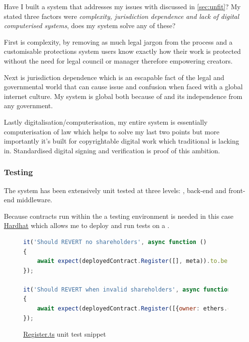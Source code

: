 Have I built a system that addresses my issues with  discussed in \autoref{sec:unfit}? My stated three factors were \textit{complexity, jurisdiction dependence and lack of digital computerised systems}, does my system solve any of these?

First is complexity, by removing as much legal jargon from the process and a customisable protections system users know exactly how their work is protected without the need for legal council or manager therefore empowering creators. 

Next is jurisdiction dependence which is an escapable fact of the legal and governmental world that can cause issue and confusion when faced with a global internet culture. My system is global both because of  and its independence from any government.

Lastly digitalisation/computerisation, my entire system is essentially computerisation of  law which helps to solve my last two points but more importantly it's built for copyrightable digital work which traditional  is lacking in. Standardised digital signing and verification is proof of this ambition.


\subsubsection{Testing}

The system has been extensively unit tested at three levels: , back-end and front-end middleware.

Because contracts run within the  a testing environment is needed in this case \href{https://hardhat.org/}{Hardhat} which allows me to deploy and run tests on a .

\begin{figure}[H]
\caption{\href{https://github.com/MrHarrisonBarker/CRPL/blob/main/CRPL.Contracts/test/Copyright/Register.ts}{Register.ts} unit test snippet}
\centering
\begin{lstlisting}[language=JavaScript]
it('Should REVERT no shareholders', async function ()
{
	await expect(deployedContract.Register([], meta)).to.be.revertedWith('NO_SHAREHOLDERS');
});

it('Should REVERT when invalid shareholders', async function ()
{
	await expect(deployedContract.Register([{owner: ethers.constants.AddressZero, share: 1}], meta)).to.be.revertedWith('INVALID_ADDR');
});
\end{lstlisting}
\end{figure}

